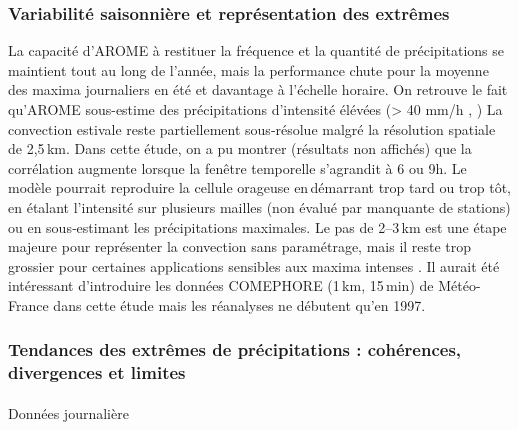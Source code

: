 \documentclass[
  article,
  nofooter,
  noheadings]{jss}
\makeatletter
\let\oldparagraph\paragraph
\renewcommand{\paragraph}{
    \@ifstar
      \xxxParagraphStar
      \xxxParagraphNoStar
  }
\newcommand{\xxxParagraphStar}[1]{\oldparagraph*{#1}\mbox{}}
\newcommand{\xxxParagraphNoStar}[1]{\oldparagraph{#1}\mbox{}}
\makeatother
\begin{document}
\subsubsection{Variabilité saisonnière et représentation des
extrêmes}\label{variabilituxe9-saisonniuxe8re-et-repruxe9sentation-des-extruxeames}

La capacité d'AROME à restituer la fréquence et la quantité de
précipitations se maintient tout au long de l'année, mais la performance
chute pour la moyenne des maxima journaliers en été et davantage à
l'échelle horaire. On retrouve le fait qu'AROME sous-estime des
précipitations d'intensité élévées (\textgreater{} 40 mm/h
\citep{Caillaud2021}, \citep{poncet2024convection}) La convection
estivale reste partiellement sous‑résolue malgré la résolution spatiale
de 2,5\,km. Dans cette étude, on a pu montrer (résultats non affichés)
que la corrélation augmente lorsque la fenêtre temporelle s'agrandit à 6
ou 9h. Le modèle pourrait reproduire la cellule orageuse en\,démarrant
trop tard ou trop tôt, en étalant l'intensité sur plusieurs mailles (non
évalué par manquante de stations) ou en sous‑estimant les précipitations
maximales. Le pas de 2--3\,km est une étape majeure pour représenter la
convection sans paramétrage, mais il reste trop grossier pour certaines
applications sensibles aux maxima intenses \citep{Prein2015Review}. Il
aurait été intéressant d'introduire les données COMEPHORE (1\,km,
15\,min) de Météo-France dans cette étude mais les réanalyses ne
débutent qu'en 1997.

\subsubsection{Tendances des extrêmes de précipitations : cohérences,
divergences et
limites}\label{tendances-des-extruxeames-de-pruxe9cipitations-cohuxe9rences-divergences-et-limites}

\paragraph{Données journalière}\label{donnuxe9es-journaliuxe8re}
\end{document}

